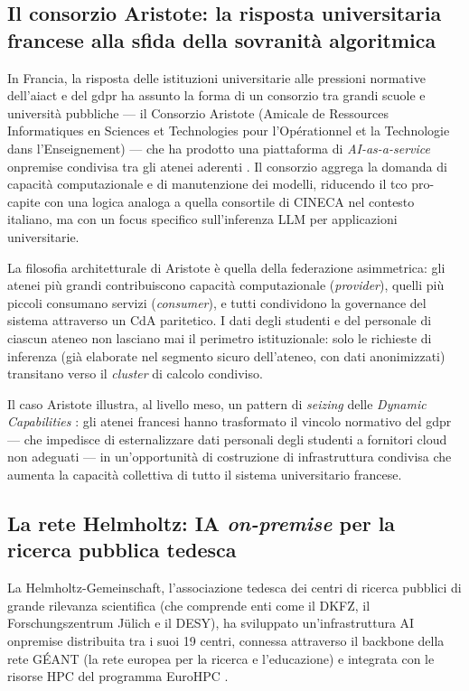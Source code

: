 \subsection{Il consorzio Aristote: la risposta universitaria francese alla sfida della
sovranità algoritmica}

In Francia, la risposta delle istituzioni universitarie alle pressioni normative
dell'\gls{aiact} e del \gls{gdpr} ha assunto la forma di un consorzio tra grandi
scuole e università pubbliche --- il Consorzio Aristote (Amicale de Ressources
Informatiques en Sciences et Technologies pour l'Opérationnel et la Technologie
dans l'Enseignement) --- che ha prodotto una piattaforma di \textit{AI-as-a-service}
\gls{onpremise} condivisa tra gli atenei aderenti \parencite{EUParl_TechSovereignty2025}.
Il consorzio aggrega la domanda di capacità computazionale e di manutenzione dei
modelli, riducendo il \gls{tco} pro-capite con una logica analoga a quella consortile
di CINECA nel contesto italiano, ma con un focus specifico sull'inferenza LLM
per applicazioni universitarie.

La filosofia architetturale di Aristote è quella della federazione
asimmetrica: gli atenei più grandi contribuiscono capacità computazionale
(\textit{provider}), quelli più piccoli consumano servizi (\textit{consumer}),
e tutti condividono la governance del sistema attraverso un CdA paritetico.
I dati degli studenti e del personale di ciascun ateneo non lasciano mai il
perimetro istituzionale: solo le richieste di inferenza (già elaborate nel
segmento sicuro dell'ateneo, con dati anonimizzati) transitano verso il
\textit{cluster} di calcolo condiviso.

Il caso Aristote illustra, al livello meso, un pattern di \textit{seizing}
delle \textit{Dynamic Capabilities} \parencite{Teece2007}: gli atenei francesi
hanno trasformato il vincolo normativo del \gls{gdpr} --- che impedisce di esternalizzare
dati personali degli studenti a fornitori cloud non adeguati --- in un'opportunità
di costruzione di infrastruttura condivisa che aumenta la capacità collettiva
di tutto il sistema universitario francese.

\subsection{La rete Helmholtz: IA \textit{on-premise} per la ricerca pubblica tedesca}

La Helmholtz-Gemeinschaft, l'associazione tedesca dei centri di ricerca
pubblici di grande rilevanza scientifica (che comprende enti come il DKFZ,
il Forschungszentrum Jülich e il DESY), ha sviluppato un'infrastruttura AI
\gls{onpremise} distribuita tra i suoi 19 centri, connessa attraverso
il backbone della rete GÉANT (la rete europea per la ricerca e l'educazione)
e integrata con le risorse HPC del programma EuroHPC
\parencite{EuroHPC_Leonardo,EUParl_TechSovereignty2025}.

